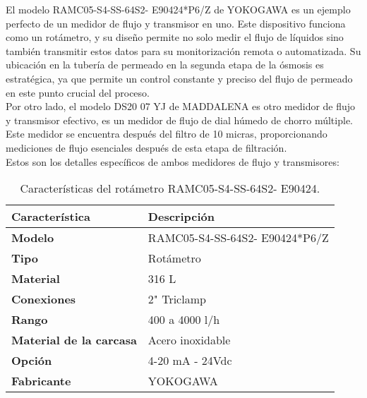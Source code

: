 El modelo RAMC05-S4-SS-64S2- E90424*P6/Z de YOKOGAWA es un ejemplo perfecto de un medidor de flujo y transmisor en uno.
Este dispositivo funciona como un rotámetro, y su diseño permite no solo medir el flujo de líquidos sino también transmitir
estos datos para su monitorización remota o automatizada. Su ubicación en la tubería de permeado en la segunda etapa de la
ósmosis es estratégica, ya que permite un control constante y preciso del flujo de permeado en este punto crucial del proceso.\\

Por otro lado, el modelo DS20 07 YJ de MADDALENA es otro medidor de flujo y transmisor efectivo,  es un medidor de flujo de dial húmedo de chorro múltiple.
Este medidor se encuentra después del
filtro de 10 micras, proporcionando mediciones de flujo esenciales después de esta etapa de filtración.\\



Estos son los detalles específicos de ambos medidores de flujo y transmisores:\\



\begin{table}[H]
    \centering
    \caption{Características del rotámetro RAMC05-S4-SS-64S2- E90424.}
    \label{table:sensor_transmisor_flujo}
    \begin{tabular}{| L{6cm} | L{6cm} |}
        \hline
        \textbf{Característica}         & \textbf{Descripción}           \\
        \hline
        \textbf{Modelo}                 & RAMC05-S4-SS-64S2- E90424*P6/Z \\
        \hline
        \textbf{Tipo}                   & Rotámetro                      \\
        \hline
        \textbf{Material}               & 316 L                          \\
        \hline
        \textbf{Conexiones}             & 2" Triclamp                    \\
        \hline
        \textbf{Rango}                  & 400 a 4000 l/h                 \\
        \hline
        \textbf{Material de la carcasa} & Acero inoxidable               \\
        \hline
        \textbf{Opción}                 & 4-20 mA - 24Vdc                \\
        \hline
        \textbf{Fabricante}             & YOKOGAWA                       \\
        \hline
    \end{tabular}
\end{table}

